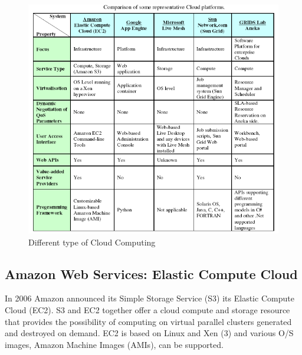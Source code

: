 \documentclass[conference, compsoc]{IEEEtran}
\begin{document}
\begin{figure}
\center
\includegraphics[scale=0.30]{Comparision cloud platform.png}
\caption{Different type of Cloud Computing}
\end{figure}


\subsection{Amazon Web Services: Elastic Compute Cloud}
In 2006 Amazon announced its Simple Storage Service (S3) its Elastic Compute Cloud (EC2). S3 and EC2 together offer a cloud compute and storage resource that provides the possibility of computing on virtual parallel clusters generated and destroyed on demand. EC2 is based on Linux and Xen (3) and various O/S images, Amazon Machine Images (AMIs), can be supported.

\end{document}
